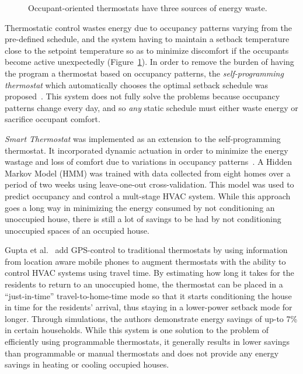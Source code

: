 \label{sec:occupantOrientedHVACControl}
\begin{figure}[t]
 \caption[Drawbacks of Occupant-oriented Thermostats]{Occupant-oriented thermostats have three sources of energy waste.} 
\label{fig:overviewReactive}
\end{figure}

Thermostatic control wastes energy due to occupancy patterns varying from the
pre-defined schedule, and the system having to maintain a setback temperature
close to the setpoint temperature so as to minimize discomfort if the occupants
become active unexpectedly (Figure~\ref{fig:overviewReactive}). In order to
remove the burden of having the program a thermostat based on occupancy
patterns, the {\em self-programming thermostat} which automatically chooses the
optimal setback schedule was proposed~\cite{gao2009self}. This system does not
fully solve the problems because occupancy patterns change every day, and so
{\em any} static schedule must either waste energy or sacrifice occupant
comfort.

{\em Smart Thermostat} was implemented as an extension to the self-programming
thermostat. It incorporated dynamic actuation in order to minimize the energy
wastage and loss of comfort due to variations in occupancy
patterns~\cite{Lu2010}. A Hidden Markov Model (HMM) was trained with data
collected from eight homes over a period of two weeks using leave-one-out
cross-validation. This model was used to predict occupancy and control a
mult-stage HVAC system. While this approach goes a long way in minimizing the
energy consumed by not conditioning an unoccupied house, there is still a lot of
savings to be had by not conditioning unoccupied spaces of an occupied house.

Gupta et al.~\cite{gupta2009adding} add GPS-control to traditional thermostats
by using information from location aware mobile phones to augment thermostats
with the ability to control HVAC systems using travel time. By estimating how
long it takes for the residents to return to an unoccupied home, the thermostat
can be placed in a ``just-in-time'' travel-to-home-time mode so that it starts
conditioning the house in time for the residents' arrival, thus staying in a
lower-power setback mode for longer. Through simulations, the authors
demonstrate energy savings of up-to 7\% in certain households. While this system
is one solution to the problem of efficiently using programmable thermostats, it
generally results in lower savings than programmable or manual thermostats and
does not provide any energy savings in heating or cooling occupied houses.


